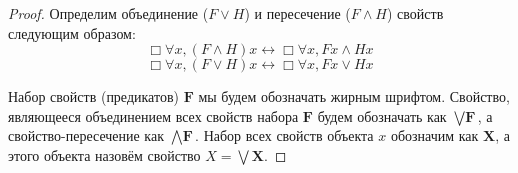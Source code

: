 \begin{proof}
Определим объединение ($F\lor H$) и пересечение ($F \land H$) свойств следующим образом:
$$\Box \forall x, (F\land H) x \leftrightarrow \Box \forall x, Fx\land Hx$$
$$\Box \forall x, (F\lor H) x \leftrightarrow \Box \forall x, Fx\lor Hx$$


Набор свойств (предикатов) $\textbf{F}$ мы будем обозначать жирным шрифтом. Свойство, являющееся объединением всех свойств набора $\textbf{F}$ будем обозначать как $\bigvee\textbf{F}$, а свойство-пересечение как $\bigwedge\textbf{F}$. Набор всех свойств объекта $x$ обозначим как $\textbf{X}$, а  этого объекта назовём свойство $X = \bigvee \textbf{X}$.


\end{proof}